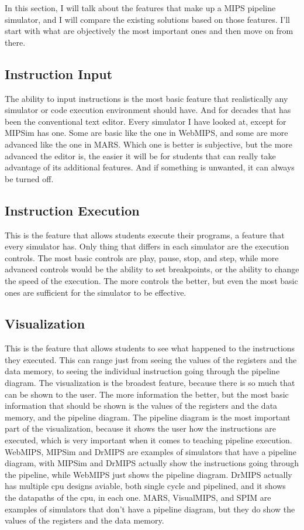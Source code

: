 In this section, I will talk about the features that make up a MIPS pipeline simulator, and I will compare the existing solutions based on those features. I'll start with what are objectively the most important ones and then move on from there.

\subsection{Instruction Input}\label{sec:instruction_input}
The ability to input instructions is the most basic feature that realistically any simulator or code execution environment should have. And for decades that has been the conventional text editor. Every simulator I have looked at, except for MIPSim has one. Some are basic like the one in WebMIPS, and some are more advanced like the one in MARS. Which one is better is subjective, but the more advanced the editor is, the easier it will be for students that can really take advantage of its additional features. And if something is unwanted, it can always be turned off.

\subsection{Instruction Execution}\label{sec:instruction_execution}
This is the feature that allows students execute their programs, a feature that every simulator has. Only thing that differs in each simulator are the execution controls. The most basic controls are play, pause, stop, and step, while more advanced controls would be the ability to set breakpoints, or the ability to change the speed of the execution. The more controls the better, but even the most basic ones are sufficient for the simulator to be effective.

\subsection{Visualization}\label{sec:instruction_visualization}
This is the feature that allows students to see what happened to the instructions they executed. This can range just from seeing the values of the registers and the data memory, to seeing the individual instruction going through the pipeline diagram. The visualization is the broadest feature, because there is so much that can be shown to the user. The more information the better, but the most basic information that should be shown is the values of the registers and the data memory, and the pipeline diagram. The pipeline diagram is the most important part of the visualization, because it shows the user how the instructions are executed, which is very important when it comes to teaching pipeline execution. WebMIPS, MIPSim and DrMIPS are examples of simulators that have a pipeline diagram, with MIPSim and DrMIPS actually show the instructions going through the pipeline, while WebMIPS just shows the pipeline diagram. DrMIPS actually has multiple cpu designs aviable, both single cycle and pipelined, and it shows the datapaths of the cpu, in each one. MARS, VisualMIPS, and SPIM are examples of simulators that don't have a pipeline diagram, but they do show the values of the registers and the data memory.

